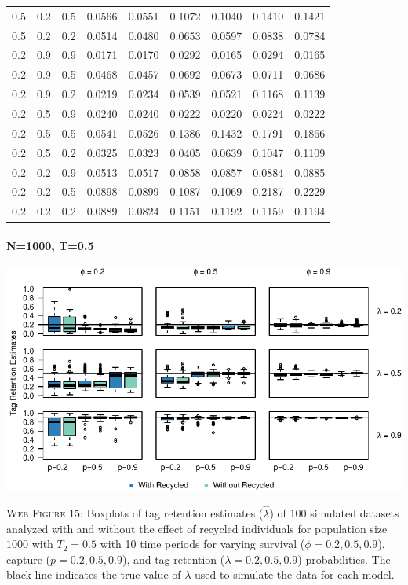 \documentclass[]{article}
\let\oldparagraph\paragraph
\renewcommand{\paragraph}[1]{\oldparagraph{#1}\mbox{}}
\begin{document}
\begin{table}[ht]
{\begin{tabular}{rrrrrrrrr}
  0.5 & 0.2 & 0.5 & 0.0566 & 0.0551 & 0.1072 & 0.1040 & 0.1410 & 0.1421 \\ 
  0.5 & 0.2 & 0.2 & 0.0514 & 0.0480 & 0.0653 & 0.0597 & 0.0838 & 0.0784 \\ 
  0.2 & 0.9 & 0.9 & 0.0171 & 0.0170 & 0.0292 & 0.0165 & 0.0294 & 0.0165 \\ 
  0.2 & 0.9 & 0.5 & 0.0468 & 0.0457 & 0.0692 & 0.0673 & 0.0711 & 0.0686 \\ 
  0.2 & 0.9 & 0.2 & 0.0219 & 0.0234 & 0.0539 & 0.0521 & 0.1168 & 0.1139 \\ 
  0.2 & 0.5 & 0.9 & 0.0240 & 0.0240 & 0.0222 & 0.0220 & 0.0224 & 0.0222 \\ 
  0.2 & 0.5 & 0.5 & 0.0541 & 0.0526 & 0.1386 & 0.1432 & 0.1791 & 0.1866 \\ 
  0.2 & 0.5 & 0.2 & 0.0325 & 0.0323 & 0.0405 & 0.0639 & 0.1047 & 0.1109 \\ 
  0.2 & 0.2 & 0.9 & 0.0513 & 0.0517 & 0.0858 & 0.0857 & 0.0884 & 0.0885 \\ 
  0.2 & 0.2 & 0.5 & 0.0898 & 0.0899 & 0.1087 & 0.1069 & 0.2187 & 0.2229 \\ 
  0.2 & 0.2 & 0.2 & 0.0889 & 0.0824 & 0.1151 & 0.1192 & 0.1159 & 0.1194 \\ 
   \hline
\end{tabular}
}
\endgroup
\end{table}

\newpage

\paragraph{N=1000, T=0.5}\label{n1000-t0.5-2}

\includegraphics{Appendix_files/figure-latex/figure15_tagretention_GJSTL4-1.pdf}

\textsc{Web Figure 15:} Boxplots of tag retention estimates
(\(\hat{\lambda}\)) of 100 simulated datasets analyzed with and without
the effect of recycled individuals for population size \(1000\) with
\(T_2=0.5\) with 10 time periods for varying survival
(\(\phi=0.2,0.5,0.9\)), capture (\(p=0.2,0.5,0.9\)), and tag retention
(\(\lambda=0.2,0.5,0.9\)) probabilities. The black line indicates the
true value of \(\lambda\) used to simulate the data for each model.
\end{document}

